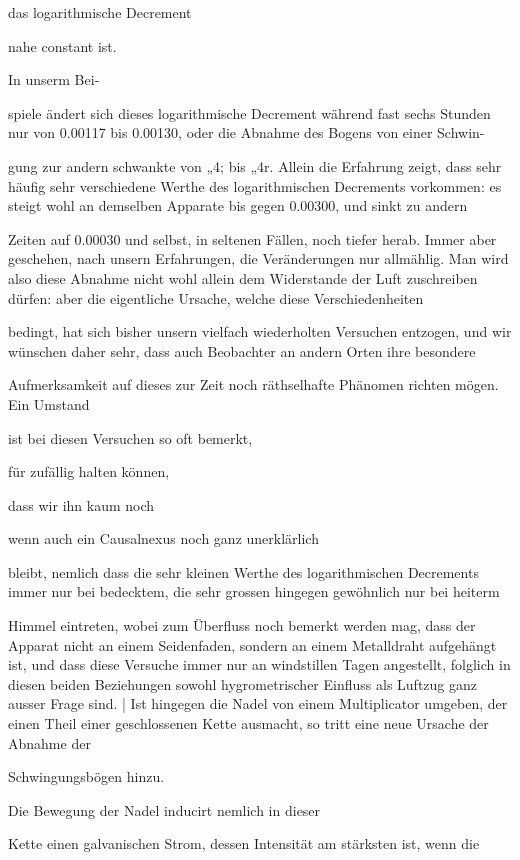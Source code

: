 \documentclass[12pt,a4paper]{article}
\begin{document}
das logarithmische Decrement

nahe constant ist.

In unserm Bei-

spiele ändert sich dieses logarithmische Decrement während fast sechs Stunden nur von 0.00117 bis 0.00130, oder die Abnahme des Bogens von einer Schwin-

gung zur andern schwankte von „4; bis „4r. Allein die Erfahrung zeigt, dass sehr häufig sehr verschiedene Werthe des logarithmischen Decrements vorkommen: es steigt wohl an demselben Apparate bis gegen 0.00300, und sinkt zu andern

Zeiten auf 0.00030 und selbst, in seltenen Fällen, noch tiefer herab. Immer aber geschehen, nach unsern Erfahrungen, die Veränderungen nur allmählig. Man wird also diese Abnahme nicht wohl allein dem Widerstande der Luft zuschreiben dürfen: aber die eigentliche Ursache, welche diese Verschiedenheiten

bedingt, hat sich bisher unsern vielfach wiederholten Versuchen entzogen, und wir wünschen daher sehr, dass auch Beobachter an andern Orten ihre besondere

Aufmerksamkeit auf dieses zur Zeit noch räthselhafte Phänomen richten mögen. Ein Umstand

ist bei diesen Versuchen so oft bemerkt,

für zufällig halten können,

dass wir ihn kaum noch

wenn auch ein Causalnexus noch ganz unerklärlich

bleibt, nemlich dass die sehr kleinen Werthe des logarithmischen Decrements immer nur bei bedecktem, die sehr grossen hingegen gewöhnlich nur bei heiterm

Himmel eintreten, wobei zum Überfluss noch bemerkt werden mag, dass der Apparat nicht an einem Seidenfaden, sondern an einem Metalldraht aufgehängt ist, und dass diese Versuche immer nur an windstillen Tagen angestellt, folglich in diesen beiden Beziehungen sowohl hygrometrischer Einfluss als Luftzug ganz ausser Frage sind. | Ist hingegen die Nadel von einem Multiplicator umgeben, der einen Theil einer geschlossenen Kette ausmacht, so tritt eine neue Ursache der Abnahme der

Schwingungsbögen hinzu.

Die Bewegung der Nadel inducirt nemlich in dieser

Kette einen galvanischen Strom, dessen Intensität am stärksten ist, wenn die
\end{document}
